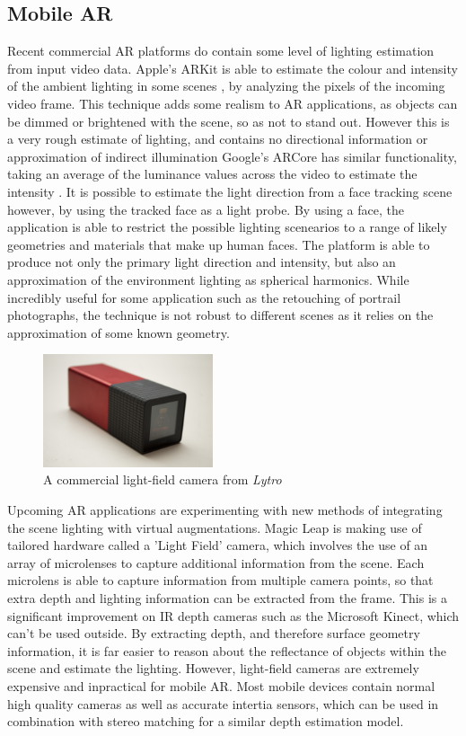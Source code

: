 \documentclass[ %
                    author={Gavin Parker},
                supervisor={Dr. Neill Campbell},
                    degree={MEng},
                     title={Deep Siamese Networks for Illumination Estimation from Stereo Images},
                  subtitle={},
                      type={research},
                      year={2018} ]{dissertation}
\begin{document}
\subsection{Mobile AR}
Recent commercial AR platforms do contain some level of lighting estimation from input video data. Apple's ARKit is able to estimate the colour and intensity of the ambient lighting in some scenes \cite{arkit1}, by analyzing the pixels of the incoming video frame. This technique adds some realism to AR applications, as objects can be dimmed or brightened with the scene, so as not to stand out. However this is a very rough estimate of lighting, and contains no directional information or approximation of indirect illumination  Google's ARCore has similar functionality, taking an average of the luminance values across the video to estimate the intensity \cite{Debevec:1998:RSO:280814.280864}. It is possible to estimate the light direction from a face tracking scene however, by using the tracked face as a light probe. By using a face, the application is able to restrict the possible lighting scenearios to a range of likely geometries and materials that make up human faces. The platform is able to produce not only the primary light direction and intensity, but also an approximation of the environment lighting as spherical harmonics. While incredibly useful for some application such as the retouching of portrail photographs, the technique is not robust to different scenes as it relies on the approximation of some known geometry.
\begin{figure}
\includegraphics[width=5cm]{images/lytro}
\centering
\caption{A commercial light-field camera from \textit{Lytro}}
\end{figure}
\newline
Upcoming AR applications are experimenting with new methods of integrating the scene lighting with virtual augmentations. Magic Leap is making use of tailored hardware called a 'Light Field' camera, which involves the use of an array of microlenses to capture additional information from the scene. Each microlens is able to capture information from multiple camera points, so that extra depth and lighting information can be extracted from the frame. This is a significant improvement on IR depth cameras such as the Microsoft Kinect, which can't be used outside. By extracting depth, and therefore surface geometry information, it is far easier to reason about the reflectance of objects within the scene and estimate the lighting. However, light-field cameras are extremely expensive and inpractical for mobile AR. Most mobile devices contain normal high quality cameras as well as accurate intertia sensors, which can be used in combination with stereo matching for a similar depth estimation model.
\end{document}
